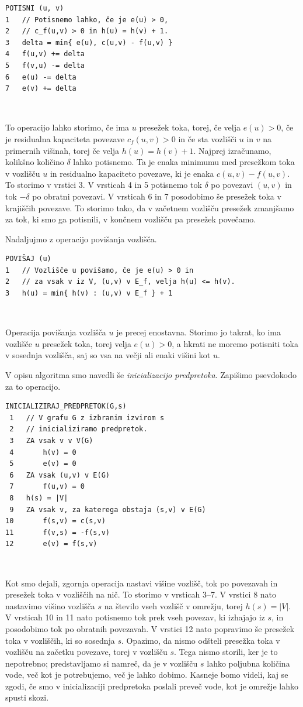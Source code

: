 \documentclass[mat1]{fmfdelo}
\begin{document}
\begin{verbatim}
POTISNI (u, v)
1   // Potisnemo lahko, če je e(u) > 0,
2   // c_f(u,v) > 0 in h(u) = h(v) + 1.
3   delta = min{ e(u), c(u,v) - f(u,v) }
4   f(u,v) += delta
5   f(v,u) -= delta
6   e(u) -= delta
7   e(v) += delta
\end{verbatim}~

To operacijo lahko storimo, če ima $u$ presežek toka, torej, če velja $e(u) > 0$, če je residualna kapaciteta povezave $c_f(u,v) > 0$ in če sta vozlišči $u$ in $v$ na primernih višinah, torej če velja $h(u) = h(v) + 1$. Najprej izračunamo, kolikšno količino $\delta$ lahko potisnemo. Ta je enaka minimumu med presežkom toka v vozlišču $u$ in residualno kapaciteto povezave, ki je enaka $c(u,v) - f(u,v)$. To storimo v vrstici 3. V vrsticah 4 in 5 potisnemo tok $\delta$ po povezavi $(u,v)$ in tok
$-\delta$ po obratni povezavi. V vrsticah 6 in 7 posodobimo še presežek toka v krajiščih povezave. To storimo tako, da v začetnem vozlišču presežek zmanjšamo za tok, ki smo ga potisnili, v končnem vozlišču pa presežek povečamo.

Nadaljujmo z operacijo povišanja vozlišča.\\

\begin{verbatim}
POVIŠAJ (u)
1   // Vozlišče u povišamo, če je e(u) > 0 in
2   // za vsak v iz V, (u,v) v E_f, velja h(u) <= h(v).
3   h(u) = min{ h(v) : (u,v) v E_f } + 1
\end{verbatim}~

Operacija povišanja vozlišča $u$ je precej enostavna. Storimo jo takrat, ko ima vozlišče $u$ presežek toka, torej velja $e(u) > 0$, a hkrati ne moremo potisniti toka v sosednja vozlišča, saj so vsa na večji ali enaki višini kot $u$.

V opisu algoritma smo navedli še \textit{inicializacijo predpretoka}. Zapišimo psevdokodo za to operacijo.\\

\begin{verbatim}
INICIALIZIRAJ_PREDPRETOK(G,s)
 1   // V grafu G z izbranim izvirom s
 2   // inicializiramo predpretok.
 3   ZA vsak v v V(G)
 4       h(v) = 0
 5       e(v) = 0
 6   ZA vsak (u,v) v E(G)
 7       f(u,v) = 0
 8   h(s) = |V|
 9   ZA vsak v, za katerega obstaja (s,v) v E(G)
10       f(s,v) = c(s,v)
11       f(v,s) = -f(s,v)
12       e(v) = f(s,v)
\end{verbatim}~

Kot smo dejali, zgornja operacija nastavi višine vozlišč, tok po povezavah in presežek toka v vozliščih na nič. To storimo v vrsticah 3--7. V vrstici 8 nato nastavimo višino vozlišča $s$ na število vseh vozlišč v omrežju, torej $h(s) = |V|$. V vrsticah 10 in 11 nato potisnemo tok prek vseh povezav, ki izhajajo iz $s$, in posodobimo tok po obratnih povezavah. V vrstici 12 nato popravimo še presežek toka v vozliščih, ki so sosednja $s$. Opazimo, da nismo odšteli presežka toka v vozlišču na začetku povezave, torej v vozlišču $s$. Tega nismo storili, ker je to nepotrebno; predstavljamo si namreč, da je v vozlišču $s$ lahko poljubna količina vode, več kot je potrebujemo, več je lahko dobimo. Kasneje bomo videli, kaj se zgodi, če smo v inicializaciji predpretoka poslali preveč vode, kot je omrežje lahko spusti skozi.
\end{document}

